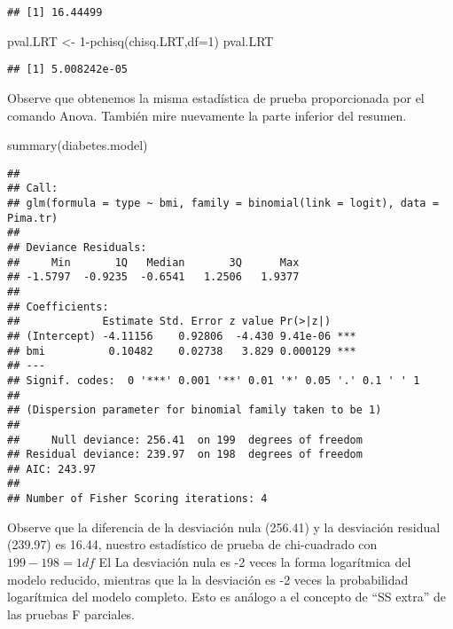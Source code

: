 \documentclass[
]{book}
\newenvironment{Shaded}{\begin{snugshade}}{\end{snugshade}}
\newcommand{\AttributeTok}[1]{\textcolor[rgb]{0.77,0.63,0.00}{#1}}
\newcommand{\DecValTok}[1]{\textcolor[rgb]{0.00,0.00,0.81}{#1}}
\newcommand{\FunctionTok}[1]{\textcolor[rgb]{0.00,0.00,0.00}{#1}}
\newcommand{\NormalTok}[1]{#1}
\newcommand{\OtherTok}[1]{\textcolor[rgb]{0.56,0.35,0.01}{#1}}
\newcommand{\SpecialCharTok}[1]{\textcolor[rgb]{0.00,0.00,0.00}{#1}}
\begin{document}
\begin{verbatim}
## [1] 16.44499
\end{verbatim}

\begin{Shaded}
\begin{Highlighting}[]
\NormalTok{pval.LRT }\OtherTok{\textless{}{-}} \DecValTok{1}\SpecialCharTok{{-}}\FunctionTok{pchisq}\NormalTok{(chisq.LRT,}\AttributeTok{df=}\DecValTok{1}\NormalTok{)}
\NormalTok{pval.LRT}
\end{Highlighting}
\end{Shaded}

\begin{verbatim}
## [1] 5.008242e-05
\end{verbatim}

Observe que obtenemos la misma estadística de prueba proporcionada por el comando Anova.
También mire nuevamente la parte inferior del resumen.

\begin{Shaded}
\begin{Highlighting}[]
\FunctionTok{summary}\NormalTok{(diabetes.model)}
\end{Highlighting}
\end{Shaded}

\begin{verbatim}
## 
## Call:
## glm(formula = type ~ bmi, family = binomial(link = logit), data = Pima.tr)
## 
## Deviance Residuals: 
##     Min       1Q   Median       3Q      Max  
## -1.5797  -0.9235  -0.6541   1.2506   1.9377  
## 
## Coefficients:
##             Estimate Std. Error z value Pr(>|z|)    
## (Intercept) -4.11156    0.92806  -4.430 9.41e-06 ***
## bmi          0.10482    0.02738   3.829 0.000129 ***
## ---
## Signif. codes:  0 '***' 0.001 '**' 0.01 '*' 0.05 '.' 0.1 ' ' 1
## 
## (Dispersion parameter for binomial family taken to be 1)
## 
##     Null deviance: 256.41  on 199  degrees of freedom
## Residual deviance: 239.97  on 198  degrees of freedom
## AIC: 243.97
## 
## Number of Fisher Scoring iterations: 4
\end{verbatim}

Observe que la diferencia de la desviación nula (256.41) y la desviación residual
(239.97) es 16.44, nuestro estadístico de prueba de chi-cuadrado con \(199-198 = 1df\) El
La desviación nula es -2 veces la forma logarítmica del modelo reducido, mientras que la
la desviación es -2 veces la probabilidad logarítmica del modelo completo. Esto es análogo a
el concepto de ``SS extra'' de las pruebas F parciales.
\end{document}
